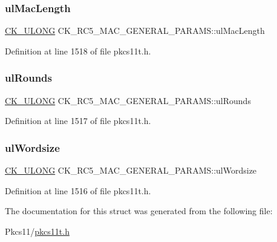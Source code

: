 \subsubsection{\texorpdfstring{ul\+Mac\+Length}{ulMacLength}}
{\footnotesize\ttfamily \hyperlink{pkcs11t_8h_a35181858a3b7a0a81f49d180d8f446ef}{C\+K\+\_\+\+U\+L\+O\+NG} C\+K\+\_\+\+R\+C5\+\_\+\+M\+A\+C\+\_\+\+G\+E\+N\+E\+R\+A\+L\+\_\+\+P\+A\+R\+A\+M\+S\+::ul\+Mac\+Length}



Definition at line 1518 of file pkcs11t.\+h.

\mbox{\label{struct_c_k___r_c5___m_a_c___g_e_n_e_r_a_l___p_a_r_a_m_s_a4159d1166521a81e37d733545e4fa33a}} 
\subsubsection{\texorpdfstring{ul\+Rounds}{ulRounds}}
{\footnotesize\ttfamily \hyperlink{pkcs11t_8h_a35181858a3b7a0a81f49d180d8f446ef}{C\+K\+\_\+\+U\+L\+O\+NG} C\+K\+\_\+\+R\+C5\+\_\+\+M\+A\+C\+\_\+\+G\+E\+N\+E\+R\+A\+L\+\_\+\+P\+A\+R\+A\+M\+S\+::ul\+Rounds}



Definition at line 1517 of file pkcs11t.\+h.

\mbox{\label{struct_c_k___r_c5___m_a_c___g_e_n_e_r_a_l___p_a_r_a_m_s_ab5c8eda50a02ba6eb5f418be440f2f16}} 
\subsubsection{\texorpdfstring{ul\+Wordsize}{ulWordsize}}
{\footnotesize\ttfamily \hyperlink{pkcs11t_8h_a35181858a3b7a0a81f49d180d8f446ef}{C\+K\+\_\+\+U\+L\+O\+NG} C\+K\+\_\+\+R\+C5\+\_\+\+M\+A\+C\+\_\+\+G\+E\+N\+E\+R\+A\+L\+\_\+\+P\+A\+R\+A\+M\+S\+::ul\+Wordsize}



Definition at line 1516 of file pkcs11t.\+h.



The documentation for this struct was generated from the following file\+:\begin{DoxyCompactItemize}
\item 
Pkcs11/\hyperlink{pkcs11t_8h}{pkcs11t.\+h}\end{DoxyCompactItemize}
